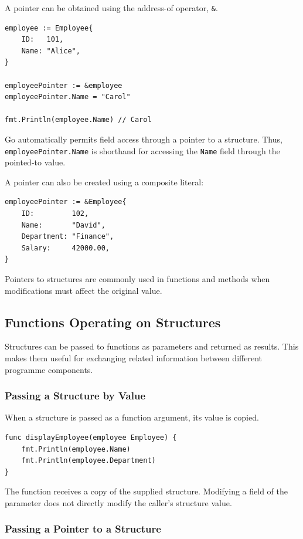 A pointer can be obtained using the address-of operator, \texttt{\&}.

\begin{lstlisting}
employee := Employee{
    ID:   101,
    Name: "Alice",
}

employeePointer := &employee
employeePointer.Name = "Carol"

fmt.Println(employee.Name) // Carol
\end{lstlisting}

Go automatically permits field access through a pointer to a structure. Thus, \texttt{employeePointer.Name} is shorthand for accessing the \texttt{Name} field through the pointed-to value.

A pointer can also be created using a composite literal:

\begin{lstlisting}
employeePointer := &Employee{
    ID:         102,
    Name:       "David",
    Department: "Finance",
    Salary:     42000.00,
}
\end{lstlisting}

Pointers to structures are commonly used in functions and methods when modifications must affect the original value.

\subsection{Functions Operating on Structures}

Structures can be passed to functions as parameters and returned as results. This makes them useful for exchanging related information between different programme components.

\subsubsection{Passing a Structure by Value}

When a structure is passed as a function argument, its value is copied.

\begin{lstlisting}
func displayEmployee(employee Employee) {
    fmt.Println(employee.Name)
    fmt.Println(employee.Department)
}
\end{lstlisting}

The function receives a copy of the supplied structure. Modifying a field of the parameter does not directly modify the caller's structure value.

\subsubsection{Passing a Pointer to a Structure}

